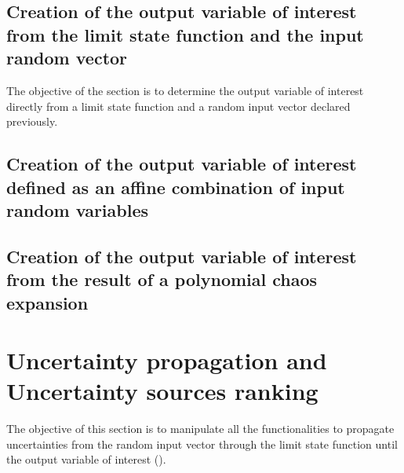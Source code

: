 
\newpage 
\newpage 
\newpage 
\newpage 
\newpage 
\newpage 

\newpage \subsection{Creation of the output variable of interest from the limit state function and the input random  vector}


The objective of the section is to determine the output variable of interest directly from a limit state function and a random input vector declared previously.



\newpage 


\newpage \subsection{Creation of the output variable of interest defined as an affine combination of input random variables}






\newpage \subsection{Creation of the output variable of interest from the result of a polynomial chaos expansion}


\newpage 

\newpage \section{Uncertainty propagation and Uncertainty sources ranking}

The objective of this section is to manipulate all the functionalities to propagate uncertainties from the random input vector through the limit state function until the output variable of interest
().

